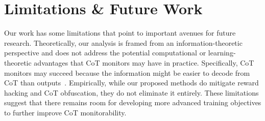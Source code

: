 \documentclass{article}
\theoremstyle{plain}
\begin{document}
\section{Limitations \& Future Work}
Our work has some limitations that point to important avenues for future research.
Theoretically, our analysis is framed from an information-theoretic perspective and does not address the potential computational or learning-theoretic advantages that CoT monitors may have in practice.
Specifically, CoT monitors may succeed because the information might be easier to decode from CoT than outputs~\citep{xu2020usable}.
Empirically, while our proposed methods do mitigate reward hacking and CoT obfuscation, they do not eliminate it entirely.
These limitations suggest that there remains room for developing more advanced training objectives to further improve CoT monitorability.


\end{document}
